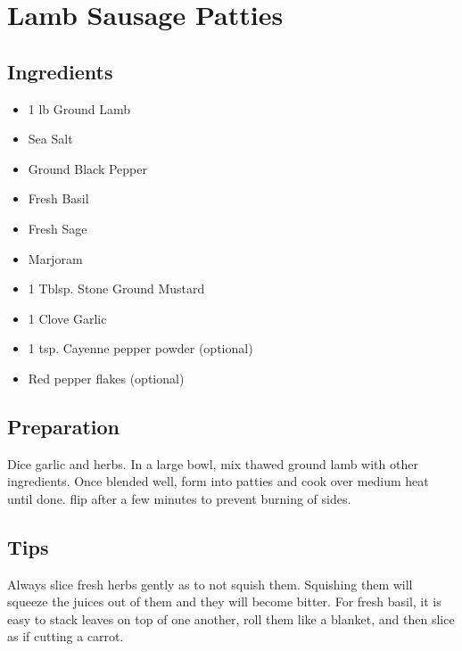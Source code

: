 \thispagestyle{fancy}
\section{Lamb Sausage Patties}
\AddToShipoutPicture*{\lambsausage}

\subsection*{Ingredients}
\begin{multicols}{2}
	\begin{itemize}
		\item 1 lb Ground Lamb
		\item Sea Salt
		\item Ground Black Pepper
		\item Fresh Basil
		\item Fresh Sage
		\item Marjoram
		\item 1 Tblsp. Stone Ground Mustard
		\item 1 Clove Garlic
		\item 1 tsp. Cayenne pepper powder (optional)
		\item Red pepper flakes (optional)
	\end{itemize}
\end{multicols}

\subsection*{Preparation}

Dice garlic and herbs. In a large bowl, mix thawed ground lamb with other ingredients. Once blended well, form into patties and cook over medium heat until done. flip after a few minutes to prevent burning of sides.

\subsection*{Tips}

Always slice fresh herbs gently as to not squish them. Squishing them will squeeze the juices out of them and they will become bitter. For fresh basil, it is easy to stack leaves on top of one another, roll them like a blanket, and then slice as if cutting a carrot.